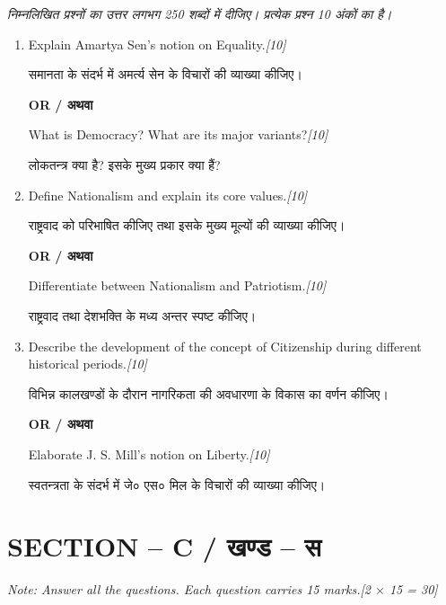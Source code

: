 \documentclass[11pt,a4paper]{article}
\newcommand{\pts}[1]{\hfill \textit{[#1]}}
\begin{document}
\noindent \textit{निम्नलिखित प्रश्नों का उत्तर लगभग 250 शब्दों में दीजिए। प्रत्येक प्रश्न 10 अंकों का है।}

\begin{enumerate}[label=\textbf{\arabic*.},leftmargin=*,start=2,itemsep=12pt]

  \item Explain Amartya Sen's notion on Equality.\pts{10}
  
  समानता के संदर्भ में अमर्त्य सेन के विचारों की व्याख्या कीजिए।

  \begin{center}\textbf{OR / अथवा}\end{center}

  What is Democracy? What are its major variants?\pts{10}
  
  लोकतन्त्र क्या है? इसके मुख्य प्रकार क्या हैं?

  \item Define Nationalism and explain its core values.\pts{10}
  
  राष्ट्रवाद को परिभाषित कीजिए तथा इसके मुख्य मूल्यों की व्याख्या कीजिए।

  \begin{center}\textbf{OR / अथवा}\end{center}

  Differentiate between Nationalism and Patriotism.\pts{10}
  
  राष्ट्रवाद तथा देशभक्ति के मध्य अन्तर स्पष्ट कीजिए।

  \item Describe the development of the concept of Citizenship during different historical periods.\pts{10}
  
  विभिन्न कालखण्डों के दौरान नागरिकता की अवधारणा के विकास का वर्णन कीजिए।

  \begin{center}\textbf{OR / अथवा}\end{center}

  Elaborate J. S. Mill's notion on Liberty.\pts{10}
  
  स्वतन्त्रता के संदर्भ में जे० एस० मिल के विचारों की व्याख्या कीजिए।

\end{enumerate}

\bigskip

\section*{SECTION -- C / खण्ड -- स}
\noindent \textit{Note: Answer all the questions. Each question carries 15 marks.}\pts{2 $\times$ 15 = 30}
\end{document}
